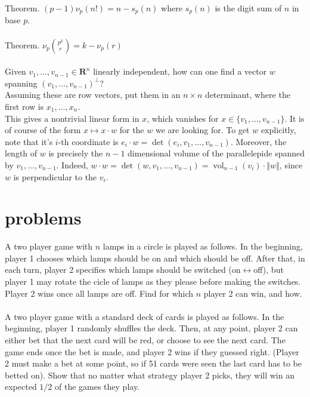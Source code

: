 \documentclass[english]{article}
\newcommand\norm[1]{\left\Vert {#1}\right\Vert }
\def\R{\mathbf{R}}
\DeclareMathOperator\vol{vol}
\begin{document}
Theorem. $(p-1)\nu_p(n!)=n-s_p(n)$ where $s_p(n)$ is the digit sum of $n$ in base $p$.
\\\\
Theorem. $\nu_p{p^k\choose r}=k-\nu_p(r)$
\\\\
Given $v_1,\dots,v_{n-1}\in\R^n$ linearly independent, how can one find a vector $w$ spanning $(v_1,\dots,v_{n-1})^{\perp}$?\\
Assuming these are row vectors, put them in an $n\times n$ determinant, where the first row is $x_1,\dots,x_n$. \\
This gives a nontrivial linear form in $x$, which vanishes for $x\in\{v_1,\dots,v_{n-1}\}$. It is of course of the form $x\mapsto x\cdot w$ for the $w$ we are looking for. To get $w$ explicitly, note that it's $i$-th coordinate is $e_i\cdot w=\det(e_i,v_1,\dots,v_{n-1})$. Moreover, the length of $w$ is precisely the $n-1$ dimensional volume of the parallelepide spanned by $v_1,\dots,v_{n-1}$. Indeed, $w\cdot w=\det(w,v_1,\dots,v_{n-1})=\vol_{n-1}(v_i)\cdot \norm{w}$, since $w$ is perpendicular to the $v_i$.
\newpage
\section*{problems}

A two player game with $n$ lamps in a circle is played as follows. In the beginning, player 1 chooses which lamps should be on and which should be off. After that, in each turn, player 2 specifies which lamps should be switched (on$\leftrightarrow$off), but player 1 may rotate the cicle of lamps as they please before making the switches. Player 2 wins once all lamps are off. Find for which $n$ player 2 can win, and how.
\\\\%

A two player game with a standard deck of cards is played as follows. In the beginning, player 1 randomly shuffles the deck. Then, at any point, player 2 can either bet that the next card will be red, or choose to see the next card. The game ends once the bet is made, and player 2 wins if they guessed right. (Player 2 must make a bet at some point, so if 51 cards were seen the last card has to be betted on). Show that no matter what strategy player 2 picks, they will win an expected $1/2$ of the games they play.
\end{document}
